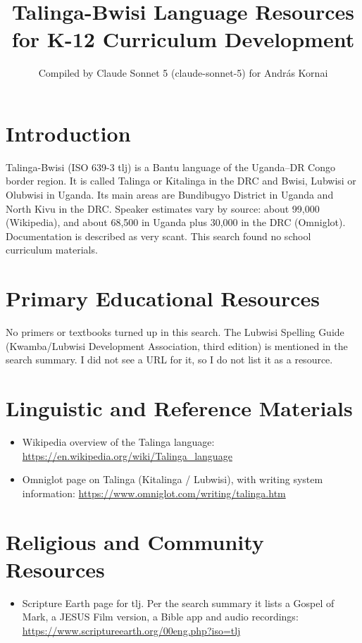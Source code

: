 \documentclass[12pt]{article}
\title{Talinga-Bwisi Language Resources for K-12 Curriculum Development}
\author{Compiled by Claude Sonnet 5 (claude-sonnet-5) for Andr\'as Kornai}
\date{}
\begin{document}
\maketitle

\section{Introduction}
Talinga-Bwisi (ISO 639-3 tlj) is a Bantu language of the Uganda--DR Congo border region. It is called Talinga or Kitalinga in the DRC and Bwisi, Lubwisi or Olubwisi in Uganda. Its main areas are Bundibugyo District in Uganda and North Kivu in the DRC. Speaker estimates vary by source: about 99,000 (Wikipedia), and about 68,500 in Uganda plus 30,000 in the DRC (Omniglot). Documentation is described as very scant. This search found no school curriculum materials.

\section{Primary Educational Resources}
No primers or textbooks turned up in this search. The Lubwisi Spelling Guide (Kwamba/Lubwisi Development Association, third edition) is mentioned in the search summary. I did not see a URL for it, so I do not list it as a resource.

\section{Linguistic and Reference Materials}
\begin{itemize}
\item Wikipedia overview of the Talinga language: \url{https://en.wikipedia.org/wiki/Talinga_language}
\item Omniglot page on Talinga (Kitalinga / Lubwisi), with writing system information: \url{https://www.omniglot.com/writing/talinga.htm}
\end{itemize}

\section{Religious and Community Resources}
\begin{itemize}
\item Scripture Earth page for tlj. Per the search summary it lists a Gospel of Mark, a JESUS Film version, a Bible app and audio recordings: \url{https://www.scriptureearth.org/00eng.php?iso=tlj}
\end{itemize}
\end{document}
